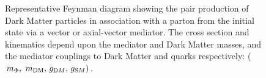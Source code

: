 
\begin{figure}[h!] \centering
{}
\caption{Representative Feynman diagram showing the pair production of Dark
Matter particles in association with a parton from the initial state via a
vector or axial-vector mediator. The cross section and kinematics depend upon
the mediator and Dark Matter masses, and the mediator couplings to Dark Matter
and quarks respectively: ($m_{\Phi} ,\ m_\textrm{DM} ,\, g_{\textrm DM} ,\,
g_{\textrm SM})$. \cite{Abercrombie:2015wmb}} \label{fig:DMfeynman} \end{figure}



